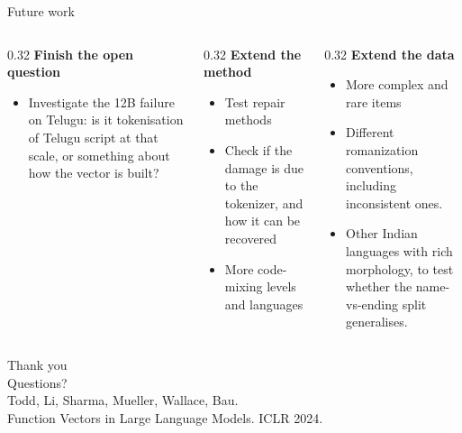\documentclass[aspectratio=169,11pt]{beamer}
\newcommand{\tight}{\setlength{\itemsep}{2pt plus 1pt minus 1pt}}
\begin{document}
\begin{frame}{Future work}
  \begin{columns}[T]
    \begin{column}{0.32\textwidth}
      \textbf{Finish the open question}
      \begin{itemize}\footnotesize\tight
        \item Investigate the 12B failure on Telugu: is it tokenisation of Telugu script
              at that scale, or something about how the vector is built?
      \end{itemize}
    \end{column}
    \begin{column}{0.32\textwidth}
      \textbf{Extend the method}
      \begin{itemize}\footnotesize\tight
        \item Test repair methods
        \item Check if the damage is due to the tokenizer, and how it can be recovered
        \item More code-mixing levels and languages
      \end{itemize}
    \end{column}
    \begin{column}{0.32\textwidth}
      \textbf{Extend the data}
      \begin{itemize}\footnotesize\tight
        \item More complex and rare items
        \item Different romanization conventions, including inconsistent ones.
        \item Other Indian languages with rich morphology, to test whether the
              name-vs-ending split generalises.
      \end{itemize}
    \end{column}
  \end{columns}
\end{frame}

\begin{frame}[plain]
  \vfill
  \centering
  {\Large Thank you}\\[6mm]
  {\large Questions?}\\[10mm]
  {\small Todd, Li, Sharma, Mueller, Wallace, Bau.\\
   Function Vectors in Large Language Models. ICLR 2024.}
  \vfill
\end{frame}
\end{document}
